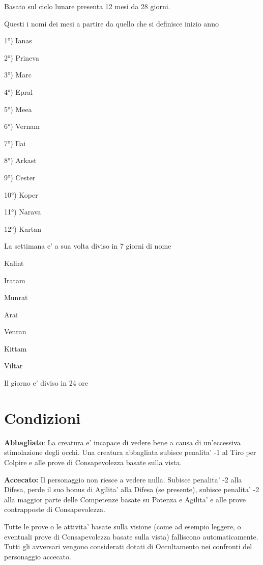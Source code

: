 \documentclass[a4paper,11pt,twoside,openany]{book}
\begin{document}
{		\label{il-calendario}
		
		Basato sul ciclo lunare presenta 12 mesi da 28 giorni.
		
		Questi i nomi dei mesi a partire da quello che si definisce inizio
		anno
		\bigskip
		
		1°) Ianas
		
		2°) Prineva
		
		3°) Marc
		
		4°) Epral
		
		5°) Meea
		
		6°) Vernam
		
		7°) Ilai
		
		8°) Arkast
		
		9°) Cester
		
		10°) Koper
		
		11°) Narava
		
		12°) Kartan
		
		\bigskip
		La settimana e' a sua volta diviso in 7 giorni di nome
		
		Kalint
		
		Iratam
		
		Munrat
		
		Arai
		
		Venran
		
		Kittam
		
		Viltar
		
		Il giorno e' diviso in 24 ore
		
		\pagebreak
		
		\section{Condizioni}
		
		\label{condizioni}
		
		\textbf{Abbagliato}: La creatura e' incapace di vedere bene a causa di un'eccessiva stimolazione degli occhi. Una creatura abbagliata subisce penalita' -1 al Tiro per Colpire e alle prove di Consapevolezza basate sulla vista.
		
		\textbf{Accecato:} Il personaggio non riesce a vedere nulla. Subisce penalita' -2 alla Difesa, perde il suo bonus di Agilita' alla Difesa (se presente), subisce penalita' -2 alla maggior parte delle Competenze basate su Potenza e Agilita' e alle prove contrapposte di Consapevolezza.
		
		Tutte le prove o le attivita' basate sulla visione (come ad esempio leggere, o eventuali prove di Consapevolezza basate sulla vista) falliscono automaticamente. Tutti gli avversari vengono considerati dotati di Occultamento nei confronti del personaggio accecato. 
		
}
\end{document}
